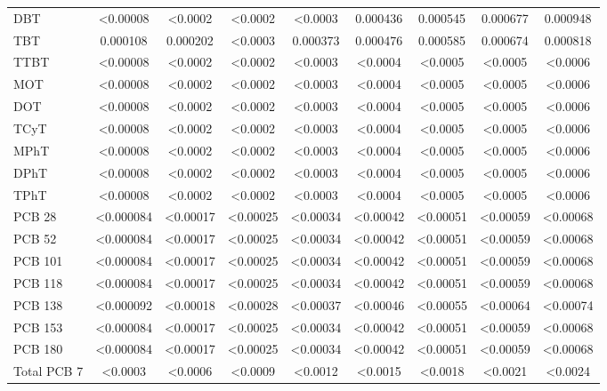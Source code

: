 \documentclass[algorithms,article,submit,pdftex,moreauthors]{Definitions/mdpi}
\begin{document}
\begin{scriptsize}
\begin{center}
\begin{longtable}{@{\extracolsep{\fill}}|p{1.8cm}|cccccccc|@{}}
DBT & <0.00008 & <0.0002 & <0.0002 & <0.0003 & 0.000436 & 0.000545 & 0.000677 & 0.000948 \\
TBT & 0.000108 & 0.000202 & <0.0003 & 0.000373 & 0.000476 & 0.000585 & 0.000674 & 0.000818 \\
TTBT & <0.00008 & <0.0002 & <0.0002 & <0.0003 & <0.0004 & <0.0005 & <0.0005 & <0.0006 \\
MOT & <0.00008 & <0.0002 & <0.0002 & <0.0003 & <0.0004 & <0.0005 & <0.0005 & <0.0006 \\
DOT & <0.00008 & <0.0002 & <0.0002 & <0.0003 & <0.0004 & <0.0005 & <0.0005 & <0.0006 \\
TCyT & <0.00008 & <0.0002 & <0.0002 & <0.0003 & <0.0004 & <0.0005 & <0.0005 & <0.0006 \\
MPhT & <0.00008 & <0.0002 & <0.0002 & <0.0003 & <0.0004 & <0.0005 & <0.0005 & <0.0006 \\
DPhT & <0.00008 & <0.0002 & <0.0002 & <0.0003 & <0.0004 & <0.0005 & <0.0005 & <0.0006 \\
TPhT & <0.00008 & <0.0002 & <0.0002 & <0.0003 & <0.0004 & <0.0005 & <0.0005 & <0.0006 \\
PCB 28 & <0.000084 & <0.00017 & <0.00025 & <0.00034 & <0.00042 & <0.00051 & <0.00059 & <0.00068 \\
PCB 52 & <0.000084 & <0.00017 & <0.00025 & <0.00034 & <0.00042 & <0.00051 & <0.00059 & <0.00068 \\
PCB 101 & <0.000084 & <0.00017 & <0.00025 & <0.00034 & <0.00042 & <0.00051 & <0.00059 & <0.00068 \\
PCB 118 & <0.000084 & <0.00017 & <0.00025 & <0.00034 & <0.00042 & <0.00051 & <0.00059 & <0.00068 \\
PCB 138 & <0.000092 & <0.00018 & <0.00028 & <0.00037 & <0.00046 & <0.00055 & <0.00064 & <0.00074 \\
PCB 153 & <0.000084 & <0.00017 & <0.00025 & <0.00034 & <0.00042 & <0.00051 & <0.00059 & <0.00068 \\
PCB 180  & <0.000084 & <0.00017 & <0.00025 & <0.00034 & <0.00042 & <0.00051 & <0.00059 & <0.00068 \\
Total PCB 7 & <0.0003 & <0.0006 & <0.0009 & <0.0012 & <0.0015 & <0.0018 & <0.0021 & <0.0024 \\
%
\end{longtable}
\end{center}
\end{scriptsize}
\end{document}
